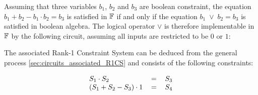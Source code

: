 Assuming that three variables $b_1$, $b_2$ and $b_3$ are boolean constraint, the equation $b_1 + b_2 - b_1\cdot b_2 = b_3$ is satisfied in $\mathbb{F}$ if and only if the equation $b_1 \; \vee \; b_2 = b_3$ is satisfied in boolean algebra. The logical operator $\vee$ is therefore implementable in $\mathbb{F}$ by the following circuit, assuming all inputs are restricted to be $0$ or $1$:
\begin{center}
\end{center}
The associated Rank-1 Constraint System can be deduced from the general process \ref{sec:circuits_associated_R1CS} and consists of the following constraints:

\begin{equation}\label{def:boolean-or_constraints}
\begin{tabular}{lcr}
$S_1 \cdot S_2$ & $=$ & $S_3$\\
$(S_1 + S_2 - S_3)\cdot 1$ &$=$ &$S_4$
\end{tabular}
\end{equation}

